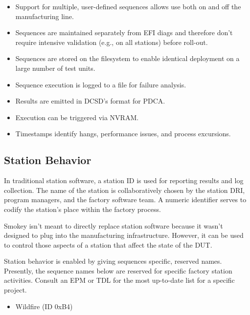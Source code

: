 \begin{itemize}

	\item Support for multiple, user-defined sequences allows use both on
	and off the manufacturing line.

	\item Sequences are maintained separately from EFI diags and therefore
	don't require intensive validation (e.g., on all stations) before
	roll-out.

	\item Sequences are stored on the filesystem to enable identical
	deployment on a large number of test units.

	\item Sequence execution is logged to a file for failure analysis.

	\item Results are emitted in DCSD's format for PDCA.

	\item Execution can be triggered via NVRAM.

	\item Timestamps identify hangs, performance issues, and process excursions.

\end{itemize}

\subsection{Station Behavior}

In traditional station software, a station ID is used for reporting results and
log collection.  The name of the station is collaboratively chosen by the
station DRI, program managers, and the factory software team.  A numeric
identifier serves to codify the station's place within the factory process.

Smokey isn't meant to directly replace station software because it wasn't
designed to plug into the manufacturing infrastructure.  However, it can be
used to control those aspects of a station that affect the state of the DUT.

Station behavior is enabled by giving sequences specific, reserved names.
Presently, the sequence names below are reserved for specific factory station
activities.  Consult an EPM or TDL for the most up-to-date list for a specific
project.

\begin{itemize}

	\item Wildfire (ID 0xB4)

\end{itemize}

